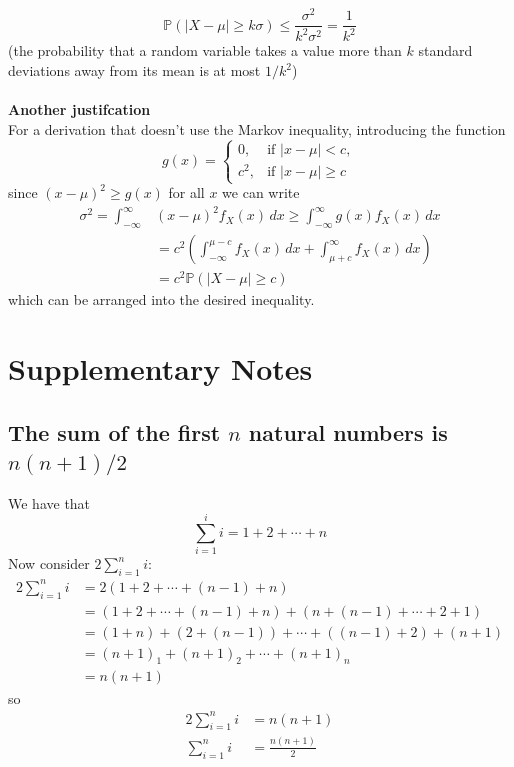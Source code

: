 \documentclass{report}
\begin{document}
\begin{equation*}
\mathbb{P}(|X-\mu|\geq k\sigma)\leq\frac{\sigma^2}{k^2\sigma^2}=\frac{1}{k^2}
\end{equation*}
(the probability that a random variable takes a value more than $k$ standard deviations away from its mean is at 
most $1/k^2$)\\
\vspace{1mm}\\
\textbf{Another justifcation}\\
For a derivation that doesn't use the Markov inequality, introducing the function
\begin{equation*}
g(x)=\begin{cases}
0,&\text{if }|x-\mu|<c,\\
c^2,&\text{if }|x-\mu|\geq c
\end{cases}
\end{equation*}
since $(x-\mu)^2\geq g(x)$ for all $x$ we can write
\begin{align*}
\sigma^2=\int^\infty_{-\infty}&(x-\mu)^2f_X(x)\,dx\geq
\int^\infty_{-\infty}g(x)f_X(x)\,dx\\
&=c^2\left(\int^{\mu-c}_{-\infty}f_X(x)\,dx+\int_{\mu+c}^\infty f_X(x)\,dx\right)\\
&=c^2\mathbb{P}(|X-\mu|\geq c)
\end{align*}
which can be arranged into the desired inequality.
\newpage

\subsection{}



\newpage

\chapter{Supplementary Notes}

\section{The sum of the first $n$ natural numbers is $n(n+1)/2$}
\label{supnotes:1}
We have that
\begin{equation*}
\sum^i_{i=1}i=1+2+\cdots+n
\end{equation*}
Now consider $2\sum^n_{i=1}i$:
\begin{align*}
2\sum^n_{i=1}i&=2(1+2+\cdots+(n-1)+n)\\
&=(1+2+\cdots+(n-1)+n)+(n+(n-1)+\cdots+2+1)\\
&=(1+n)+(2+(n-1))+\cdots+((n-1)+2)+(n+1)\\
&=(n+1)_1+(n+1)_2+\cdots+(n+1)_n\\
&=n(n+1)
\end{align*}
so
\begin{align*}
2\sum^n_{i=1}i&=n(n+1)\\
\sum^n_{i=1}i&=\frac{n(n+1)}{2}
\end{align*}
\newpage
\end{document}
